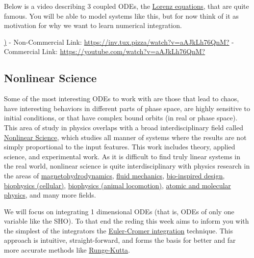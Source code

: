 Below is a video describing 3 coupled ODEs, the
\href{https://en.wikipedia.org/wiki/Lorenz_system}{Lorenz equations},
that are quite famous. You will be able to model systems like this, but
for now think of it as motivation for why we want to learn numerical
integration.

\href{https://inv.tux.pizza/watch?v=aAJkLh76QnM}{\pandocbounded{\texttt{[image: https://markdown-videos-api.jorgenkh.no/youtube/aAJkLh76QnM?width=720\&height=405]}})}
- Non-Commercial Link: \url{https://inv.tux.pizza/watch?v=aAJkLh76QnM?}
- Commercial Link: \url{https://youtube.com/watch?v=aAJkLh76QnM?}

\subsection{Nonlinear Science}\label{nonlinear-science}

Some of the most interesting ODEs to work with are those that lead to
chaos, have interesting behaviors in different parts of phase space, are
highly sensitive to initial conditions, or that have complex bound
orbits (in real or phase space). This area of study in physics overlaps
with a broad interdisciplinary field called
\href{https://en.wikipedia.org/wiki/Nonlinear_system}{Nonlinear
Science}, which studies all manner of systems where the results are not
simply proportional to the input features. This work includes theory,
applied science, and experimental work. As it is difficult to find truly
linear systems in the real world, nonlinear science is quite
interdisciplinary with physics research in the areas of
\href{https://complex.umd.edu/research/MHD_dynamos/MHD_dynamos.php}{magnetohydrodynamics},
\href{}{fluid mechanics},
\href{https://meche.mit.edu/people/faculty/PEKO@MIT.EDU}{bio-inspired
design}, \href{https://curtisresearch.gatech.edu/index.php}{biophysics
(cellular)}, \href{https://crablab.gatech.edu/}{biophysics (animal
locomotion)}, \href{https://jila.colorado.edu/lewandowski}{atomic and
molecular physics}, and many more fields.

We will focus on integrating 1 dimensional ODEs (that is, ODEs of only
one variable like the SHO). To that end the reding this week aims to
inform you with the simplest of the integrators the
\href{https://en.wikipedia.org/wiki/Semi-implicit_Euler_method}{Euler-Cromer
integration} technique. This approach is intuitive, straight-forward,
and forms the basis for better and far more accurate methods like
\href{https://en.wikipedia.org/wiki/Runge\%E2\%80\%93Kutta_methods}{Runge-Kutta}.

